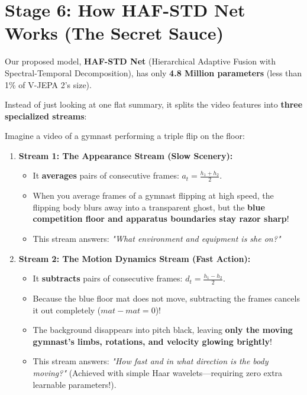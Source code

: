 \documentclass[a4paper, 11pt]{article}
\begin{document}
\section{Stage 6: How HAF-STD Net Works (The Secret Sauce)}

Our proposed model, \textbf{HAF-STD Net} (Hierarchical Adaptive Fusion with Spectral-Temporal Decomposition), has only \textbf{4.8 Million parameters} (less than 1\% of V-JEPA 2's size). 

Instead of just looking at one flat summary, it splits the video features into \textbf{three specialized streams}:

\begin{examplebox}
Imagine a video of a gymnast performing a triple flip on the floor:

\begin{enumerate}
    \item \textbf{Stream 1: The Appearance Stream (Slow Scenery):}
    \begin{itemize}
        \item It \textbf{averages} pairs of consecutive frames: $a_t = \frac{h_1 + h_2}{2}$.
        \item When you average frames of a gymnast flipping at high speed, the flipping body blurs away into a transparent ghost, but the \textbf{blue competition floor and apparatus boundaries stay razor sharp}!
        \item This stream answers: \textit{"What environment and equipment is she on?"}
    \end{itemize}

    \item \textbf{Stream 2: The Motion Dynamics Stream (Fast Action):}
    \begin{itemize}
        \item It \textbf{subtracts} pairs of consecutive frames: $d_t = \frac{h_1 - h_2}{2}$.
        \item Because the blue floor mat does not move, subtracting the frames cancels it out completely ($mat - mat = 0$)!
        \item The background disappears into pitch black, leaving \textbf{only the moving gymnast's limbs, rotations, and velocity glowing brightly}!
        \item This stream answers: \textit{"How fast and in what direction is the body moving?"} (Achieved with simple Haar wavelets—requiring zero extra learnable parameters!).
    \end{itemize}


\end{enumerate}
\end{examplebox}
\end{document}
